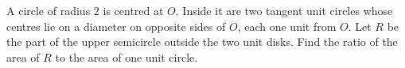 A circle of radius $2$ is centred at $O$. Inside it are two tangent unit circles whose centres lie on a diameter on opposite sides of $O$, each one unit from $O$. Let $R$ be the part of the upper semicircle outside the two unit disks. Find the ratio of the area of $R$ to the area of one unit circle.
